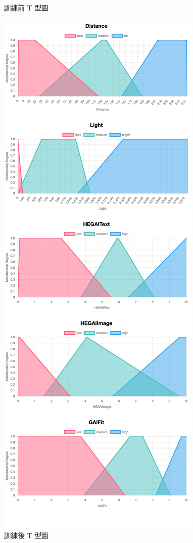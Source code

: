 \documentclass[twocolumn,11pt,a4paper]{article}
\begin{document}
\begin{figure}[htbp]
\begin{minipage}[t]{0.48\textwidth}
        \caption{訓練前 T 型圖}
        \label{fig:all_BT}  
    \end{minipage}\hfill %
    \begin{minipage}[t]{0.48\textwidth}
        \centering
        \includegraphics[width=\linewidth]{res/image/all_AL.png}
        \caption{訓練後 T 型圖} %
        \label{fig:all_AL}  
    \end{minipage}
\end{figure}
\end{document}

